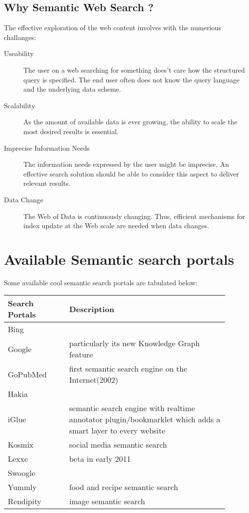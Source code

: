 \documentclass[12pt,a4]{article}
\begin{document}
\subsection{Why Semantic Web Search ?}
The effective exploration of the web content involves with the numerious challanges:
\begin{description}
\item[Useability] The user on a web searching for something does't care how the structured query is specified. The end user often does not know the query language and the underlying data scheme.
\item[Scalability] As the amount of available data is ever growing, the ability to scale the most desired results is essential.
\item[Imprecise Information Needs] The information needs expressed by the user might be imprecise. An effective search solution should be able to consider this aspect to deliver relevant results.
\item[Data Change] The Web of Data is continuously changing. Thus, efficient mechanisms for index update at the Web scale are needed when data changes. 
\end{description}


\section{Available Semantic search portals}
Some available cool semantic search portals are tabulated below:


\begin{tabular}{p{0.25\linewidth}|p{0.65\linewidth}}
  \hline
  Search Portals &Description \\
    \hline
    Bing\\
    Google& particularly its new Knowledge Graph feature\\
    GoPubMed&first semantic search engine on the Internet(2002)\\
    Hakia\\
    iGlue & semantic search engine with realtime annotator plugin/bookmarklet which adds a smart layer to every website\\
    Kosmix & social media semantic search\\
    Lexxe & beta in early 2011\\
    Swoogle\\
    Yummly& food and recipe semantic search\\
    Rendipity & image semantic search\\
    
    \hline
  \end{tabular}
  
\end{document}

